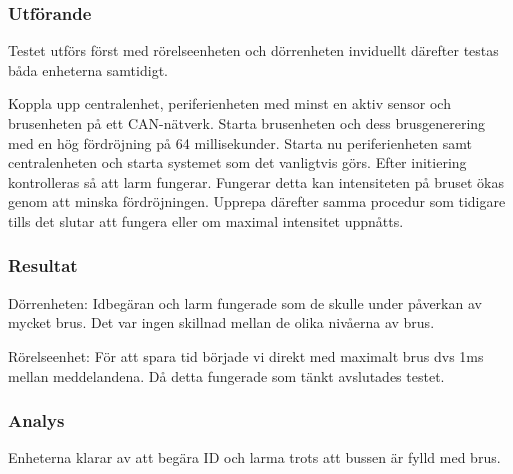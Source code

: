 \subsubsection*{Utförande}
Testet utförs först med rörelseenheten och dörrenheten inviduellt därefter testas båda enheterna samtidigt.

Koppla upp centralenhet, periferienheten med minst en aktiv sensor och brusenheten på ett CAN-nätverk. Starta brusenheten och dess brusgenerering med en hög fördröjning på 64 millisekunder. Starta nu periferienheten samt centralenheten och starta systemet som det vanligtvis görs. Efter initiering kontrolleras så att larm fungerar. Fungerar detta kan intensiteten på bruset ökas genom att minska fördröjningen. Upprepa därefter samma procedur som tidigare tills det slutar att fungera eller om maximal intensitet uppnåtts.


\subsubsection*{Resultat}
Dörrenheten: Idbegäran och larm fungerade som de skulle under påverkan av mycket brus. Det var ingen skillnad mellan de olika nivåerna av brus.

Rörelseenhet: För att spara tid började vi direkt med maximalt brus dvs 1ms mellan meddelandena. Då detta fungerade som tänkt avslutades testet.


\subsubsection*{Analys}
Enheterna klarar av att begära ID och larma trots att bussen är fylld med brus.

